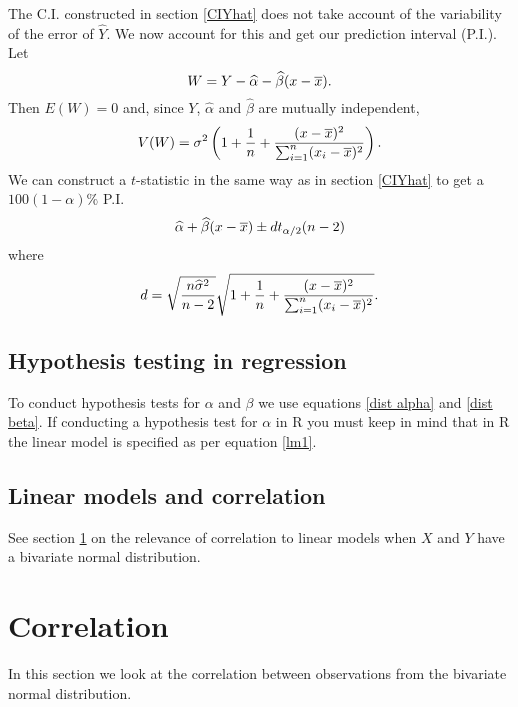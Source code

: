 \documentclass[10pt, two column]{article}
\begin{document}
The C.I. constructed in section \ref{CIYhat} does not take account of the variability of the error of $\widehat{Y}$. We now account for this and get our prediction interval (P.I.). Let \vspace{-6pt}
\[
W = Y - \widehat{\alpha} - \widehat{\beta}(x - \overline{x}).
\vspace{-6pt} \]
Then $E(W) = 0$ and, since $Y$, $\widehat{\alpha}$ and $\widehat{\beta}$ are mutually independent, \vspace{-6pt}
\[
V(W) = \sigma^{2} \left( 1 + \frac{1}{n} + \frac{(x - \overline{x})^{2}}{\sum_{i=1}^{n} (x_{i} - \overline{x})^{2}} \right).
\vspace{-6pt} \]
We can construct a $t$-statistic in the same way as in section \ref{CIYhat} to get a $100(1-\alpha)\%$ P.I. \vspace{-6pt}
\[
\widehat{\alpha} + \widehat{\beta}(x - \overline{x}) \pm d t_{\alpha/2}(n-2) 
\vspace{-6pt}\]
where \vspace{-6pt}
\[
 d = \sqrt{\frac{n\widehat{\sigma}^{2}}{n-2}} \sqrt{ 1 + \frac{1}{n} + \frac{(x - \overline{x})^{2}}{\sum_{i=1}^{n} (x_{i} - \overline{x})^{2}} }. 
\vspace{-6pt}\]

\subsection{Hypothesis testing in regression}

To conduct hypothesis tests for $\alpha$ and $\beta$ we use equations \eqref{dist alpha} and \eqref{dist beta}. If conducting a hypothesis test for $\alpha$ in R you must keep in mind that in R the linear model is specified as per equation \eqref{lm1}.

\subsection{Linear models and correlation}

See section \ref{correlation} on the relevance of correlation to linear models when $X$ and $Y$ have a bivariate normal distribution. 

\section{Correlation} \label{correlation}

In this section we look at the correlation between observations from the bivariate normal distribution. 
\end{document}
